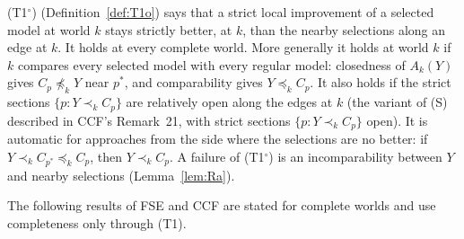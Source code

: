 \documentclass[11pt]{article}
\theoremstyle{definition}\newtheorem{definition}[theorem]{Definition}
\theoremstyle{remark}\newtheorem{remark}[theorem]{Remark}
\newcommand{\To}{\textup{(T1$^\circ$)}}
\begin{document}
\To{} (Definition~\ref{def:T1o}) says that a strict local improvement of a
selected model at world $k$ stays strictly better, at $k$, than the nearby
selections along an edge at $k$. It holds at every complete world. More
generally it holds at world $k$ if $k$ compares every selected model with
every regular model: closedness of $A_k(Y)$ gives $C_p\not\preceq_kY$ near
$p^*$, and comparability gives $Y\preceq_kC_p$. It also holds if the strict
sections $\{p:Y\prec_kC_p\}$ are relatively open along the edges at $k$
(the variant of (S) described in CCF's Remark~21, with strict sections
$\{p:Y\prec_kC_p\}$ open). It is automatic for approaches from
the side where the selections are no better: if $Y\prec_kC_{p^*}\preceq_k
C_p$, then $Y\prec_kC_p$. A failure of \To{} is an incomparability between
$Y$ and nearby selections (Lemma~\ref{lem:Ra}).

The following results of FSE and CCF are stated for complete worlds and use
completeness only through (T1).
\end{document}
